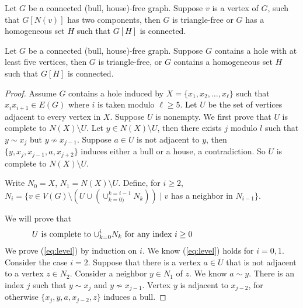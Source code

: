 \documentclass[10pt,a4paper]{amsart}
\newcommand{\thecolor}{black}
\begin{document}
\begin{lemma}\label{lem:split-vertex}
    Let $G$ be a connected (bull, house)-free graph. Suppose $v$ is a vertex of $G$, such that $G[N(v)]$ has two components, then $G$ is triangle-free or $G$ has a  homogeneous set \textcolor{\thecolor}{$H$ such that $G[H]$ is connected}.
\end{lemma}

\begin{lemma}\label{lem:hole}
    Let $G$ be a connected (bull, house)-free graph. Suppose $G$ contains a hole with at least five vertices, then $G$ is triangle-free, or $G$ contains a  homogeneous set $H$ such that $G[H]$ is connected.
\end{lemma}

\begin{proof}
    Assume $G$ contains a hole induced by $X = \{x_1, x_2, \ldots, x_{\ell}\}$ such that $x_{i}x_{i+1}\in E(G)$ where $i$ is taken modulo $ \ell \ge 5$. Let $U$ be the set of vertices
    adjacent to every vertex in $X$. Suppose $U$ is nonempty. We first prove that $U$ is complete to $N(X)\setminus U$. Let $y\in N(X)\setminus U$, then there exists $j$ modulo $l$ such that $y \sim x_j$  but  $y \not\sim x_{j-1}$. Suppose $a\in U$ is not adjacent to $y$, then $\{y, x_{j}, x_{j-1}, a, x_{j+2}\}$ induces either a bull or a house, a contradiction. So $U$ is complete to $N(X)\setminus U$.
    
    Write $N_0 = X$, $N_1 = N(X)\setminus U$. Define, for $i \geq 2$,  $N_i = \{ v \in V(G) \setminus (U \cup (\cup_{k=0)}^{k=i-1} N_k)) \; | \; v$ has a neighbor in $N_{i-1} \}$.

    We will prove that  
\begin{equation}\label{eq:level}
	\text{\parbox{.85\textwidth}{$U$ is complete to $\cup_{k=0}^{i} N_k$ for any index $i \geq 0$}}
\end{equation}
    We prove (\ref{eq:level}) by induction on $i$. We know (\ref{eq:level}) holds for $i = 0,1$. Consider the case $i=2$. Suppose that there is a vertex $a \in U$ that is not adjacent to a vertex $z \in N_2$. Consider a neighbor $y \in N_1$ of $z$. We know $a \sim y$. There is an index $j$ such that  $ y \sim x_j$ and  $ y \not\sim x_{j-1}$. Vertex $y$ is adjacent to $x_{j-2}$, for otherwise $\{ x_j, y, a, x_{j-2}, z \}$ induces a bull. 



\end{proof}
\end{document}
